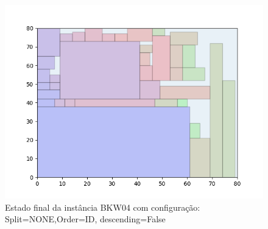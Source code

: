 \begin{figure}[H]
    \centering
    \caption[]{Estado final da instância BKW04 com configuração: Split=NONE,Order=ID, descending=False}
    \label{fig:bkw04-none-id-false}
    \includegraphics[scale=0.5]{output/figures/bkw/bkw04/none/id/false/00}
\end{figure}